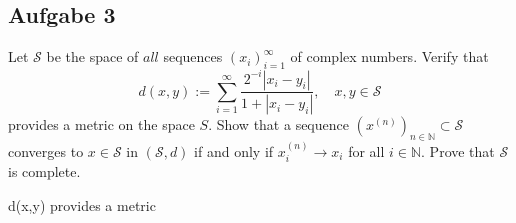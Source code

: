 \documentclass[a4paper]{article}
\newcommand{\N}{\mathbb{N}} %
\begin{document}
\subsection*{Aufgabe 3}
Let $\mathcal{S}$ be the space of $all$ sequences $(x_i)_{i = 1}^{\infty}$ of complex numbers. Verify that 
\begin{equation*}
    d(x,y) := \sum_{i = 1}^{\infty} \frac{2^{-i} |x_i - y_i|}{1+ |x_i - y_i|}, \quad x,y \in \mathcal{S}
\end{equation*}
provides a metric on the space $S$. Show that a sequence $(x^{(n)})_{n \in \N} \subset \mathcal{S}$ converges to $x \in \mathcal{S}$ in $(\mathcal{S}, d)$ if and only if $x_i^{(n)} \to x_i$ for all $i \in \N$. Prove that $\mathcal{S}$ is complete.
\begin{lemma}{}{}
    d(x,y) provides a metric 
\end{lemma}
\end{document}
